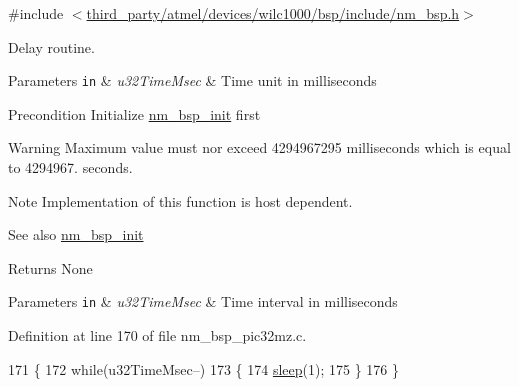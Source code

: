 {\ttfamily \#include $<$\hyperlink{nm__bsp_8h}{third\+\_\+party/atmel/devices/wilc1000/bsp/include/nm\+\_\+bsp.\+h}$>$}



Delay routine. 


\begin{DoxyParams}[1]{Parameters}
\mbox{\tt in}  & {\em u32\+Time\+Msec} & Time unit in milliseconds \\
\hline
\end{DoxyParams}
\begin{DoxyPrecond}{Precondition}
Initialize \hyperlink{group__NmBspInitFn_ga91533a50cf3da832110a746b4a57789e}{nm\+\_\+bsp\+\_\+init} first 
\end{DoxyPrecond}
\begin{DoxyWarning}{Warning}
Maximum value must nor exceed 4294967295 milliseconds which is equal to 4294967. seconds. 
\end{DoxyWarning}
\begin{DoxyNote}{Note}
Implementation of this function is host dependent. 
\end{DoxyNote}
\begin{DoxySeeAlso}{See also}
\hyperlink{group__NmBspInitFn_ga91533a50cf3da832110a746b4a57789e}{nm\+\_\+bsp\+\_\+init} 
\end{DoxySeeAlso}
\begin{DoxyReturn}{Returns}
None
\end{DoxyReturn}

\begin{DoxyParams}[1]{Parameters}
\mbox{\tt in}  & {\em u32\+Time\+Msec} & Time interval in milliseconds \\
\hline
\end{DoxyParams}


Definition at line 170 of file nm\+\_\+bsp\+\_\+pic32mz.\+c.


\begin{DoxyCode}
171 \{
172    \textcolor{keywordflow}{while}(u32TimeMsec--)
173    \{
174       \hyperlink{os__port_8h_af36a7a9c1ad704d0da2e660dab735b2a}{sleep}(1);
175    \}
176 \}
\end{DoxyCode}
